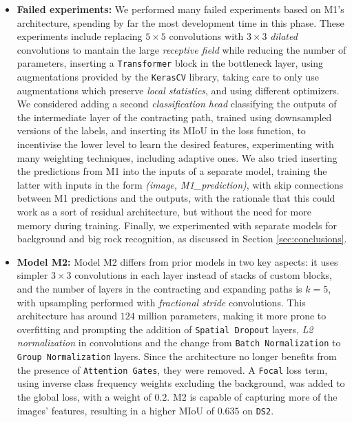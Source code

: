 \documentclass[11pt]{article}
\begin{document}
\begin{multicols}{2}
\begin{itemize}[leftmargin=*]
            \item \textbf{Failed experiments:} We performed many failed experiments based on M1's architecture, spending by far the most development time in this phase. These experiments include replacing $5\times5$ convolutions with $3\times3$ \textit{dilated} convolutions to mantain the large \textit{receptive field} while reducing the number of parameters, inserting a \texttt{Transformer}\cite{vaswani2023attentionneed} block in the bottleneck layer, using augmentations provided by the \texttt{KerasCV}\cite{wood2022kerascv} library, taking care to only use augmentations which preserve \textit{local statistics}, and using different optimizers. We considered adding a second \textit{classification head} classifying the outputs of the intermediate layer of the contracting path, trained using downsampled versions of the labels, and inserting its MIoU in the loss function, to incentivise the lower level to learn the desired features, experimenting with many weighting techniques, including adaptive ones. We also tried inserting the predictions from M1 into the inputs of a separate model, training the latter with inputs in the form \textit{(image, M1\_prediction)}, with skip connections between M1 predictions and the outputs, with the rationale that this could work as a sort of residual architecture, but without the need for more memory during training. Finally, we experimented with separate models for background and big rock recognition, as discussed in Section \ref{sec:conclusions}.
            \item \textbf{Model M2:} Model M2 differs from prior models in two key aspects: it uses simpler $3\times3$ convolutions in each layer instead of stacks of custom blocks, and the number of layers in the contracting and expanding paths is $k=5$, with upsampling performed with \textit{fractional stride} convolutions. This architecture has around $124$ million parameters, making it more prone to overfitting and prompting the addition of \texttt{Spatial Dropout} layers, \textit{L2 normalization} in convolutions and the change from \texttt{Batch Normalization} to \texttt{Group Normalization} layers. Since the architecture no longer benefits from the presence of \texttt{Attention Gates}, they were removed. A \texttt{Focal}\cite{lin2018focallossdenseobject} loss term, using inverse class frequency weights excluding the background, was added to the global loss, with a weight of $0.2$. M2 is capable of capturing more of the images' features, resulting in a higher MIoU of $0.635$ on \texttt{DS2}.
      \end{itemize}


\end{multicols}
\end{document}
